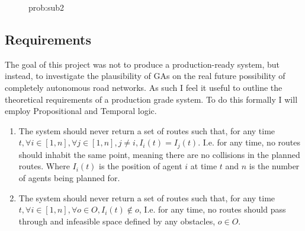 \begin{figure}[htpb]
    \centering
    \begin{problem}{prob:sub2}
    \end{problem}
\end{figure} 


\subsection{Requirements}
\label{subsec:requirements}

The goal of this project was not to produce a production-ready system, but instead, to investigate the plausibility of GAs on the real future possibility of completely autonomous road networks. As such I feel it useful to outline the theoretical requirements of a production grade system. To do this formally I will employ Propositional and Temporal logic.

\begin{enumerate}
\item The system should never return a set of routes such that, for any time $t , \forall i \in [1,n], \forall j \in [1,n], j \neq i, I_{i}(t) = I_{j}(t)$. I.e. for any time, no routes should inhabit the same point, meaning there are no collisions in the planned routes. Where $I_{i}(t)$ is the position of agent $i$ at time $t$ and $n$ is the number of agents being planned for.

  \item The system should never return a set of routes such that, for any time $t , \forall i\in [1,n], \forall o \in O, I_{i}(t) \notin o$, I.e. for any time, no routes should pass through and infeasible space defined by any obstacles, $o\in O$.
\end{enumerate}


